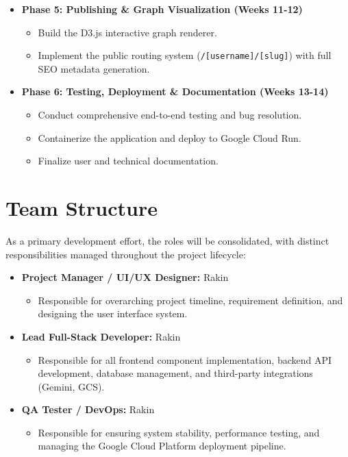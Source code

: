 \documentclass[12pt, a4paper]{article}
\begin{document}
\begin{itemize}[leftmargin=2em]
\begin{itemize}
            \item Develop the \texttt{[[wiki-link]]} parsing logic and connect the Google Gemini AI streaming interface.
        \end{itemize}
    \item \textbf{Phase 5: Publishing \& Graph Visualization (Weeks 11-12)}
        \begin{itemize}
            \item Build the D3.js interactive graph renderer.
            \item Implement the public routing system (\texttt{/[username]/[slug]}) with full SEO metadata generation.
        \end{itemize}
    \item \textbf{Phase 6: Testing, Deployment \& Documentation (Weeks 13-14)}
        \begin{itemize}
            \item Conduct comprehensive end-to-end testing and bug resolution.
            \item Containerize the application and deploy to Google Cloud Run.
            \item Finalize user and technical documentation.
        \end{itemize}
\end{itemize}

\section{Team Structure}

As a primary development effort, the roles will be consolidated, with distinct responsibilities managed throughout the project lifecycle:

\begin{itemize}[leftmargin=2em]
    \item \textbf{Project Manager / UI/UX Designer:} Rakin
        \begin{itemize}
            \item Responsible for overarching project timeline, requirement definition, and designing the user interface system.
        \end{itemize}
    \item \textbf{Lead Full-Stack Developer:} Rakin
        \begin{itemize}
            \item Responsible for all frontend component implementation, backend API development, database management, and third-party integrations (Gemini, GCS).
        \end{itemize}
    \item \textbf{QA Tester / DevOps:} Rakin
        \begin{itemize}
            \item Responsible for ensuring system stability, performance testing, and managing the Google Cloud Platform deployment pipeline.
        \end{itemize}
\end{itemize}
\end{document}
